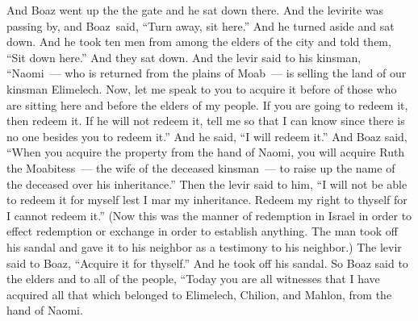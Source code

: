 
\begin{inparaenum}
   And Boaz went up the the gate and he sat down there. And the levirite was passing by, and Boaz\understood\ said, ``Turn away, sit here.'' And he turned aside and sat down.%
   And he took ten men from among the elders of the city and told them, ``Sit down here.'' And they sat down.%
   And the levir said to his kinsman, ``Naomi~--- who is returned from the plains of Moab~--- is selling the land of our kinsman Elimelech.%
   Now, let me speak to you to acquire it before of those who are sitting here and before the elders of my people. If you are going to redeem it, then redeem it. If he will not redeem it, tell me so that I can know since there is no one besides you to redeem it.'' And he said, ``I will redeem it.''%
   And Boaz said, ``When you acquire the property from the hand of Naomi, you will acquire Ruth the Moabitess~--- the wife of the deceased kinsman~--- to raise up the name of the deceased over his inheritance.''%
   Then the levir said to him, ``I will not be able to redeem it for myself lest I mar my inheritance. Redeem my right to thyself for I cannot redeem it.''%
   (Now this was the manner of redemption in Israel in order to effect redemption or exchange in order to establish anything. The man took off his sandal and gave it to his neighbor as a testimony to his neighbor.)%
   The levir said to Boaz, ``Acquire it for thyself.'' And he took off his sandal.%
   So Boaz said to the elders and to all of the people, ``Today you are all witnesses that I have acquired all that which belonged to Elimelech, Chilion, and Mahlon, from the hand of Naomi.%

\end{inparaenum}
